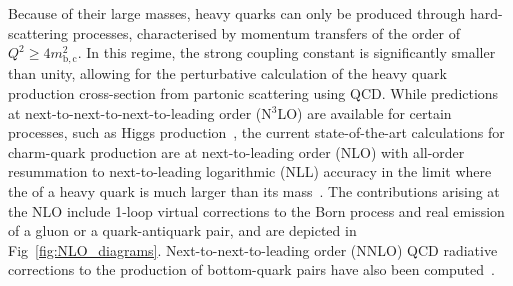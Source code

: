 \begin{sloppypar}
Because of their large masses, heavy quarks can only be produced through hard-scattering processes, characterised by momentum transfers of the order of \mbox{$Q^2 \geq 4m^2_\mathrm{b,c}$}. In this regime, the strong coupling constant is significantly smaller than unity, allowing for the perturbative calculation of the heavy quark production cross-section from partonic scattering using QCD. While predictions at next-to-next-to-next-to-leading order (N$^3$LO) are available for certain processes, such as Higgs production~\cite{Anastasiou:2015vya, Anastasiou:2016cez}, the current state-of-the-art calculations for charm-quark production are at next-to-leading order (NLO) with all-order resummation to next-to-leading logarithmic (NLL) accuracy in the limit where the \pt of a heavy quark is much larger than its mass~\cite{Cacciari:1998it}. The contributions arising at the NLO include 1-loop virtual corrections to the Born process and real emission of a gluon or a quark-antiquark pair, and are depicted in Fig~\ref{fig:NLO_diagrams}. Next-to-next-to-leading order (NNLO) QCD radiative corrections to the production of bottom-quark pairs have also been computed~\cite{Catani:2020kkl}.
\end{sloppypar}

